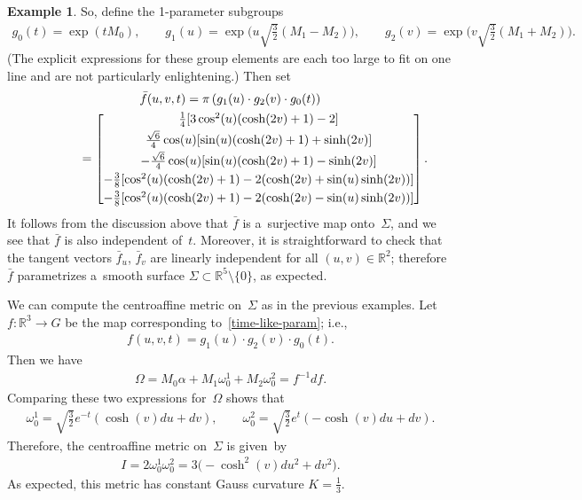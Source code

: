 \documentclass[10pt,a4paper]{amsart}
\numberwithin{equation}{section}
\theoremstyle{definition}
\newtheorem{exmpl}[teo]{Example}
\begin{document}
\begin{exmpl}
So, def\/ine the 1-parameter subgroups
\begin{gather*}
g_0(t) = \exp(tM_0),
\qquad\! \!
g_1(u) = \exp\Big(u \sqrt{\tfrac{3}{2}} (M_1 - M_2)\Big),
\qquad\! \!
g_2(v) = \exp\Big(v \sqrt{\tfrac{3}{2}} (M_1 + M_2)\Big).
\end{gather*}
(The explicit expressions for these group elements are each too large to f\/it on one line and are not particularly
enlightening.) Then set
\begin{gather}
\bar{f}(u,v,t)=\pi\left(g_1(u) \cdot g_2(v) \cdot g_0(t) \right)
\nonumber
\\
\phantom{\bar{f}(u,v,t)}
  =
\begin{bmatrix}
\frac{1}{4}[3 \cos^2(u)(\cosh(2v) + 1) - 2]
\vspace{1mm}\\
\frac{\sqrt{6}}{4} \cos(u) [\sin(u)(\cosh(2v) + 1) + \sinh(2v)]
\vspace{1mm}\\
-\frac{\sqrt{6}}{4} \cos(u) [\sin(u)(\cosh(2v) + 1) - \sinh(2v)]
\vspace{1mm}\\
-\frac{3}{8} [\cos^2(u)(\cosh(2v) + 1) - 2(\cosh(2v) + \sin(u) \sinh(2v))]
\vspace{1mm}\\
-\frac{3}{8} [\cos^2(u)(\cosh(2v) + 1) - 2(\cosh(2v) - \sin(u) \sinh(2v))]
\end{bmatrix}.
\label{time-like-param}
\end{gather}
It follows from the discussion above that $\bar{f}$ is a~surjective map onto~$\Sigma$, and we see that $\bar{f}$ is also
independent of~$t$.
Moreover, it is straightforward to check that the tangent vectors $\bar{f}_u$, $\bar{f}_v$ are linearly independent for
all $(u,v) \in \mathbb{R}^2$; therefore $\bar{f}$ parametrizes a~smooth surface $\Sigma \subset \mathbb{R}^5 \setminus
\{0 \}$, as expected.

We can compute the centroaf\/f\/ine metric on~$\Sigma$ as in the previous examples.
Let $f:\mathbb{R}^3 \to G$ be the map corresponding to~\eqref{time-like-param}; i.e.,
\begin{gather*}
f(u,v,t) = g_1(u) \cdot g_2(v) \cdot g_0(t).
\end{gather*}
Then we have
\begin{gather*}
\Omega = M_0  \alpha + M_1  \omega^1_0 + M_2  \omega^2_0 = f^{-1}  df.
\end{gather*}
Comparing these two expressions for~$\Omega$ shows that
\begin{gather*}
\omega^1_0 = \sqrt{\frac{3}{2}} e^{-t} \left(\cosh (v)  du + dv \right),
\qquad
\omega^2_0 = \sqrt{\frac{3}{2}} e^{t} \left(-\cosh (v)  du + dv \right).
\end{gather*}
Therefore, the centroaf\/f\/ine metric on~$\Sigma$ is given~by
\begin{gather*}
I = 2 \omega^1_0 \omega^2_0 = 3\big({-}\cosh^2(v)  du^2 + dv^2\big).
\end{gather*}
As expected, this metric has constant Gauss curvature $K = \frac{1}{3}$.


\end{exmpl}
\end{document}
